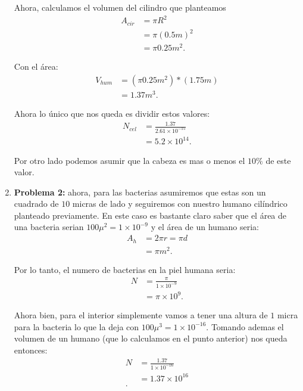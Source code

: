\documentclass[12pt]{exam}
\begin{document}
\begin{enumerate}
    Ahora, calculamos el volumen del cilindro que planteamos
    \begin{align*}
      A_{cir} &= \pi R^{2}\\
      &= \pi \left( 0.5 m \right)^2 \\
      &= \pi 0.25 m^2
    .\end{align*}

    Con el área:
    \begin{align*}
      V_{hum} &= \left( \pi 0.25 m^2 \right) * \left( 1.75 m \right)  \\
      &= 1.37 m^{3}
    .\end{align*}

    Ahora lo único que nos queda es dividir estos valores:
    \begin{align*}
      N_{cel} &= \frac{1.37}{2.61\times 10^{-15}} \\
      &= 5.2 \times 10^{14}
    .\end{align*}
    
    Por otro lado podemos asumir que la cabeza es mas o menos el $10\%$ de este valor.
  \item \textbf{Problema 2:} ahora, para las bacterias asumiremos que estas son un cuadrado de $10$ micras de lado y seguiremos con nuestro humano cilíndrico planteado previamente. En este caso es bastante claro saber que el área de una bacteria serian $100 \mu^2 = 1\times 10^{-9}$ y el área de un humano seria:
    \begin{align*}
      A_{h} &= 2\pi r = \pi d\\
	    &=  \pi m^{2}
    .\end{align*}

    Por lo tanto, el numero de bacterias en la piel humana seria:
    \begin{align*}
      N &= \frac{\pi}{1\times 10^{-9}} \\
     &= \pi\times 10^{9}
    .\end{align*}

    Ahora bien, para el interior simplemente vamos a tener una altura de $1$ micra para la bacteria lo que la deja con $100 \mu^3 = 1\times 10^{-16}$. Tomando ademas el volumen de un humano (que lo calculamos en el punto anterior) nos queda entonces:
    \begin{align*}
      N &= \frac{1.37}{1\times 10^{-16}} \\
      &= 1.37 \times 10^{16} \\
    .\end{align*}


\end{enumerate}
\end{document}
